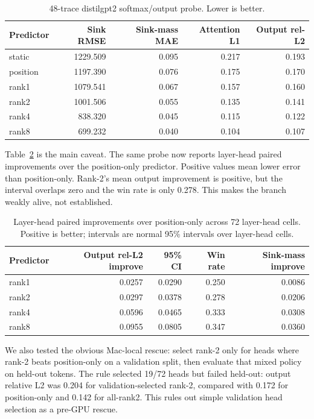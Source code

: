 \documentclass{article}
\begin{document}
\begin{table}[h]
\centering
\small
\begin{tabular}{lrrrr}
\toprule
Predictor & Sink RMSE & Sink-mass MAE & Attention L1 & Output rel-L2 \\
\midrule
static & 1229.509 & 0.095 & 0.217 & 0.193 \\
position & 1197.390 & 0.076 & 0.175 & 0.170 \\
rank1 & 1079.541 & 0.067 & 0.157 & 0.160 \\
rank2 & 1001.506 & 0.055 & 0.135 & 0.141 \\
rank4 & 838.320 & 0.045 & 0.115 & 0.122 \\
rank8 & 699.232 & 0.040 & 0.104 & 0.107 \\
\bottomrule
\end{tabular}
\caption{48-trace distilgpt2 softmax/output probe. Lower is better.}
\label{tab:aggregate}
\end{table}

Table~\ref{tab:paired} is the main caveat. The same probe now reports layer-head paired improvements over the position-only predictor. Positive values mean lower error than position-only. Rank-2's mean output improvement is positive, but the interval overlaps zero and the win rate is only 0.278. This makes the branch weakly alive, not established.

\begin{table}[h]
\centering
\small
\begin{tabular}{lrrrr}
\toprule
Predictor & Output rel-L2 improve & 95\% CI & Win rate & Sink-mass improve \\
\midrule
rank1 & 0.0257 & 0.0290 & 0.250 & 0.0086 \\
rank2 & 0.0297 & 0.0378 & 0.278 & 0.0206 \\
rank4 & 0.0596 & 0.0465 & 0.333 & 0.0308 \\
rank8 & 0.0955 & 0.0805 & 0.347 & 0.0360 \\
\bottomrule
\end{tabular}
\caption{Layer-head paired improvements over position-only across 72 layer-head cells. Positive is better; intervals are normal 95\% intervals over layer-head cells.}
\label{tab:paired}
\end{table}

We also tested the obvious Mac-local rescue: select rank-2 only for heads where
rank-2 beats position-only on a validation split, then evaluate that mixed
policy on held-out tokens. The rule selected 19/72 heads but failed held-out:
output relative L2 was 0.204 for validation-selected rank-2, compared with
0.172 for position-only and 0.142 for all-rank2. This rules out simple
validation head selection as a pre-GPU rescue.
\end{document}
